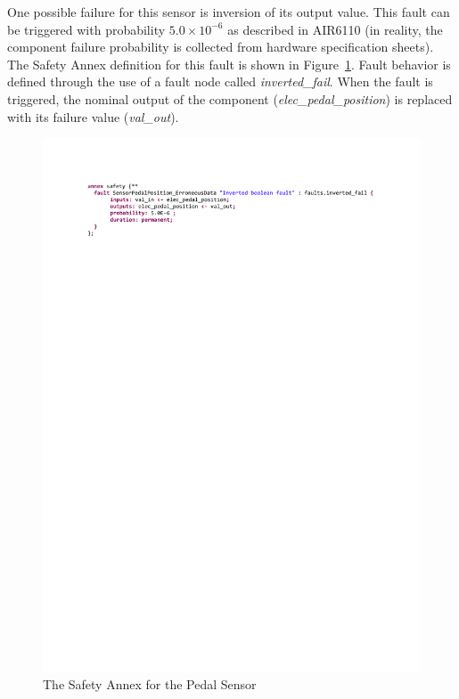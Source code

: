 One possible failure for this sensor is inversion of its output value. This fault can be triggered with probability $5.0\times 10^{-6}$ as described in AIR6110 (in reality, the component failure probability is 
collected from hardware specification sheets).  
The Safety Annex definition for this fault is shown in Figure~\ref{fig:sensorFault}. Fault behavior is defined through the use of a fault node called \textit{inverted\_fail}.  When the fault is triggered, the nominal output of the component (\textit{elec\_pedal\_position}) is replaced with its failure value (\textit{val\_out}). 

\begin{figure}[h!]
	\hspace*{-2cm}
	\begin{center}
		\includegraphics[trim=0 680 -10 70,clip,width=1.5\dimexpr\textwidth-2cm\relax]{images/safetyannex_sensorfault.pdf}
		\vspace{-0.2in}
		\caption{The Safety Annex for the Pedal Sensor}
		\label{fig:sensorFault}
	\end{center}
	\vspace{-0.2in}
\end{figure}

